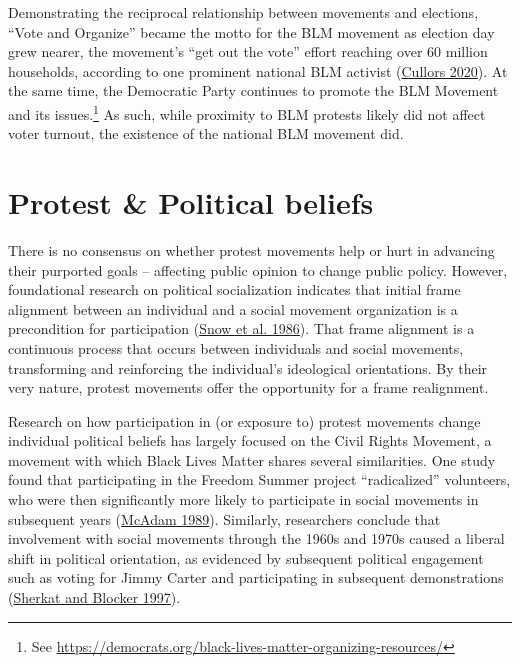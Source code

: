 \documentclass[
  12pt,
]{article}
\begin{document}
Demonstrating the reciprocal relationship between movements and elections, ``Vote and Organize'' became the motto for the BLM movement as election day grew nearer, the movement's ``get out the vote'' effort reaching over 60 million households, according to one prominent national BLM activist (\protect\hyperlink{ref-Cullors2020}{Cullors 2020}). At the same time, the Democratic Party continues to promote the BLM Movement and its issues.\footnote{See \url{https://democrats.org/black-lives-matter-organizing-resources/}} As such, while proximity to BLM protests likely did not affect voter turnout, the existence of the national BLM movement did.

\hypertarget{protest-political-beliefs}{%
\section*{Protest \& Political beliefs}\label{protest-political-beliefs}}

There is no consensus on whether protest movements help or hurt in advancing their purported goals -- affecting public opinion to change public policy. However, foundational research on political socialization indicates that initial frame alignment between an individual and a social movement organization is a precondition for participation (\protect\hyperlink{ref-Snow1986}{Snow et al. 1986}). That frame alignment is a continuous process that occurs between individuals and social movements, transforming and reinforcing the individual's ideological orientations. By their very nature, protest movements offer the opportunity for a frame realignment.

Research on how participation in (or exposure to) protest movements change individual political beliefs has largely focused on the Civil Rights Movement, a movement with which Black Lives Matter shares several similarities. One study found that participating in the Freedom Summer project ``radicalized'' volunteers, who were then significantly more likely to participate in social movements in subsequent years (\protect\hyperlink{ref-McAdam1989}{McAdam 1989}). Similarly, researchers conclude that involvement with social movements through the 1960s and 1970s caused a liberal shift in political orientation, as evidenced by subsequent political engagement such as voting for Jimmy Carter and participating in subsequent demonstrations (\protect\hyperlink{ref-Sherkat1997}{Sherkat and Blocker 1997}).
\end{document}
